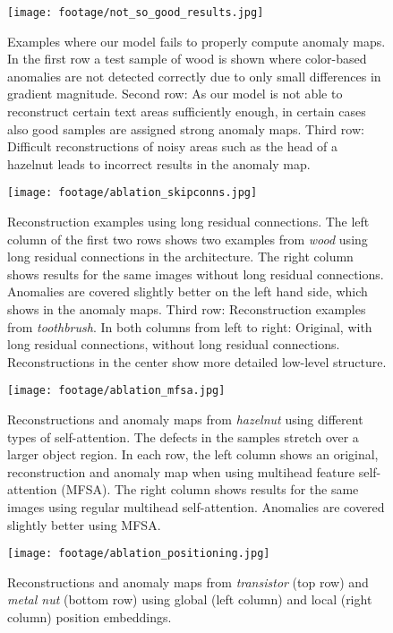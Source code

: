 \documentclass[final,5p,times,twocolumn]{elsarticle}
\begin{document}
	\begin{figure}[h]
		\centering
		\texttt{[image: footage/not\_so\_good\_results.jpg]}
		\caption{ Examples where our model fails to properly compute anomaly maps.
			In the first row a test sample of wood is shown where color-based anomalies are not detected correctly due to only small differences in gradient  magnitude. Second row: As our model is not able to reconstruct certain text areas sufficiently enough, in certain cases also good samples are assigned strong anomaly maps.
			Third row: Difficult reconstructions of noisy areas such as the head of a hazelnut leads to incorrect results in the anomaly map.}
		\label{fig:not_so_good_results}
	\end{figure}
	
	\begin{figure}[h]
		\centering
		\texttt{[image: footage/ablation\_skipconns.jpg]}
		\caption{Reconstruction examples using long residual connections. The left column of the first two rows shows two examples from \textit{wood} using long residual connections in the architecture. The right column shows results for the same images without long residual connections. Anomalies are covered slightly better on the left hand side, which shows in the anomaly maps. Third row: Reconstruction examples from \textit{toothbrush}. In both columns from left to right: Original, with long residual connections, without long residual connections. Reconstructions in the center show more detailed low-level structure.}
		\label{fig:ablation_skipconns}
	\end{figure}
	
	\begin{figure}[h]
		\centering
		\texttt{[image: footage/ablation\_mfsa.jpg]}
		\caption{Reconstructions and anomaly maps from \textit{hazelnut} using different types of self-attention. The defects in the samples stretch over a larger object region. In each row, the left column shows an original, reconstruction and anomaly map when using multihead feature self-attention (MFSA). The right column shows results for the same images using regular multihead self-attention. Anomalies are covered slightly better using MFSA.}
		\label{fig:ablation_mfsa}
	\end{figure}
	
	\begin{figure}[h]
		\centering
		\texttt{[image: footage/ablation\_positioning.jpg]}
		\caption{Reconstructions and anomaly maps from \textit{transistor} (top row) and \textit{metal nut} (bottom row) using global (left column) and local (right column) position embeddings.}
		\label{fig:ablation_position}
	\end{figure}
	
\end{document}
